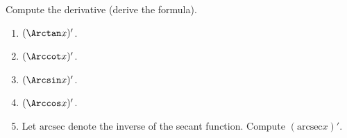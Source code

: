 Compute the derivative (derive the formula).

\begin{multicols}{2}
\begin{enumerate}
\item $(\Arctan x) '$. 
\item $(\Arccot x)'$. 
\item $(\Arcsin x)'$. 
\item $(\Arccos x)'$. 
\item Let $\text{arcsec}$ denote the inverse of the secant function. Compute $(\text{arcsec} x)'$.
\end{enumerate}
\end{multicols}